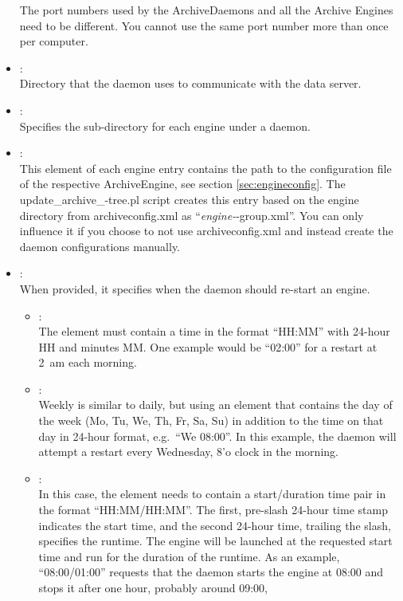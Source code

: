 \begin{itemize}
      \NOTE The port numbers used by the ArchiveDaemons and all the Archive
      Engines need to be different. You cannot use the same port number more
      than once per computer.
\item {}:\\
      Directory that the daemon uses to communicate with the data server.
\item {}:\\
      Specifies the sub-directory for each engine under a daemon.
\item {}:\\
      This element of each engine entry contains the path to the
      configuration file of the respective ArchiveEngine, see section
      \ref{sec:engineconfig}. The update\_archive\_-tree.pl script
      creates this entry based on the engine directory from
      archiveconfig.xml as ``{\it engine-}-group.xml''. You can only
      influence it if you choose to not use archiveconfig.xml and
      instead create the daemon configurations manually.
\item {}:\\
      When provided, it specifies when the daemon should re-start an engine.
      \begin{itemize}
      \item {}:\\
         The element must contain a time in the
	 format ``HH:MM'' with 24-hour HH and minutes MM. One example
	 would be ``02:00'' for a restart at 2~am each morning.
      \item {}:\\
	 Weekly is similar to daily, but using an element that contains the day
	 of the week (Mo, Tu,  We, Th, Fr, Sa, Su) in addition to the time
	 on that day in 24-hour format, e.g.\ ``We 08:00''. In this example,
	 the daemon will attempt a restart every Wednesday,
         8'o clock in the morning.
      \item {}:\\
	 In this case, the element needs to contain a start/duration time pair
	 in the format ``HH:MM/HH:MM''. The first, pre-slash 24-hour time stamp
	 indicates the start time, and the second 24-hour time, trailing the
	 slash, specifies the runtime. The engine will be launched at the
	 requested start time and run for the duration of the runtime. As an
	 example, ``08:00/01:00'' requests that the daemon starts the engine at
	 08:00 and stops it after one hour, probably around 09:00,

\end{itemize}
\end{itemize}
